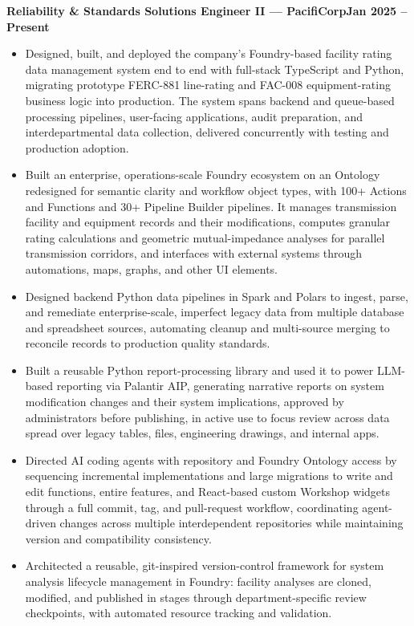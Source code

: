 \documentclass[10pt, letterpaper]{article}
\newcommand{\jobline}[2]{%
  \vspace{5pt}%
  \noindent\textbf{#1}\hfill\textbf{#2}\par%
  \vspace{1pt}%
}
\newenvironment{rlist}{%
  \begin{itemize}[leftmargin=1.4em, itemsep=1pt, topsep=2pt, parsep=0pt]%
}{%
  \end{itemize}%
}
\begin{document}
\jobline{Reliability \& Standards Solutions Engineer II --- PacifiCorp}{Jan 2025 -- Present}
\begin{rlist}
  \item Designed, built, and deployed the company's Foundry-based facility rating data management system end to end with full-stack TypeScript and Python, migrating prototype FERC-881 line-rating and FAC-008 equipment-rating business logic into production. The system spans backend and queue-based processing pipelines, user-facing applications, audit preparation, and interdepartmental data collection, delivered concurrently with testing and production adoption.
  \item Built an enterprise, operations-scale Foundry ecosystem on an Ontology redesigned for semantic clarity and workflow object types, with 100+ Actions and Functions and 30+ Pipeline Builder pipelines. It manages transmission facility and equipment records and their modifications, computes granular rating calculations and geometric mutual-impedance analyses for parallel transmission corridors, and interfaces with external systems through automations, maps, graphs, and other UI elements.
  \item Designed backend Python data pipelines in Spark and Polars to ingest, parse, and remediate enterprise-scale, imperfect legacy data from multiple database and spreadsheet sources, automating cleanup and multi-source merging to reconcile records to production quality standards.
  \item Built a reusable Python report-processing library and used it to power LLM-based reporting via Palantir AIP, generating narrative reports on system modification changes and their system implications, approved by administrators before publishing, in active use to focus review across data spread over legacy tables, files, engineering drawings, and internal apps.
  \item Directed AI coding agents with repository and Foundry Ontology access by sequencing incremental implementations and large migrations to write and edit functions, entire features, and React-based custom Workshop widgets through a full commit, tag, and pull-request workflow, coordinating agent-driven changes across multiple interdependent repositories while maintaining version and compatibility consistency.
  \item Architected a reusable, git-inspired version-control framework for system analysis lifecycle management in Foundry: facility analyses are cloned, modified, and published in stages through department-specific review checkpoints, with automated resource tracking and validation.

\end{rlist}
\end{document}
